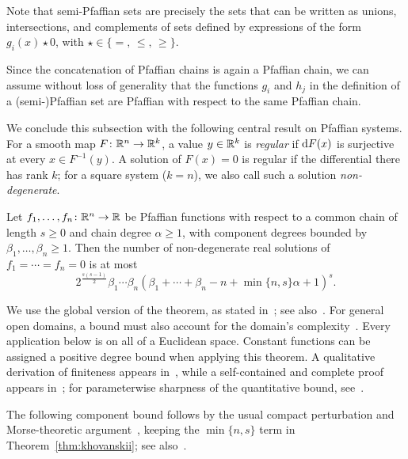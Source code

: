 Note that semi-Pfaffian sets are precisely the sets that can be written as unions, intersections, and complements of sets defined by expressions of the form $g_i(x) \star 0$, with $\star \in \{=,\, \leq,\, \geq\}$. 

\begin{remark}
  Since the concatenation of Pfaffian chains is again a Pfaffian chain, we can assume without loss of generality that the functions $g_i$ and $h_j$ in the definition of a (semi-)Pfaffian set are Pfaffian with respect to the same Pfaffian chain.
\end{remark} 

We conclude this subsection with the following central result on Pfaffian systems.
For a smooth map $F\colon \mathbb{R}^n\to\mathbb{R}^k$, a value $y\in\mathbb{R}^k$ is \emph{regular} if $\mathrm{d}{F}(x)$ is surjective at every $x\in F^{-1}(y)$. A solution of $F(x)=0$ is regular if the differential there has rank $k$; for a square system ($k=n$), we also call such a solution \emph{non-degenerate}.

\begin{theorem}[Khovanskii]\label{thm:khovanskii}
Let $f_1,\dots,f_n\colon\mathbb{R}^n\to\mathbb{R}$ be Pfaffian functions with respect to a common chain of length $s\ge0$ and chain degree $\alpha\ge1$, with component degrees bounded by $\beta_1,\dots,\beta_n\ge1$. Then the number of non-degenerate real solutions of $f_1=\cdots=f_n=0$ is at most
\begin{equation*}
2^{\frac{s(s-1)}2}\beta_1\cdots\beta_n
\left(\beta_1+\cdots+\beta_n-n+\min\{n,s\}\alpha+1\right)^s.
\end{equation*}
\end{theorem}

We use the global version of the theorem, as stated in~\cite[Theorem 3.1]{gabrielov2004complexity}; see also~\cite[\S 3.12, Corollary 5]{khovanskii1991fewnomials}. For general open domains, a bound must also account for the domain's complexity~\cite[Remark 2.12]{gabrielov2004complexity}. Every application below is on all of a Euclidean space. Constant functions can be assigned a positive degree bound when applying this theorem.
A qualitative derivation of finiteness appears in~\cite{Marker1997}, while a self-contained and complete proof appears in~\cite{lotz2026khovanskii}; for parameterwise sharpness of the quantitative bound, see~\cite{bickerton2026sharpnesskhovanskiisbezouttypebound}.

The following component bound follows by the usual compact perturbation and Morse-theoretic argument~\cite[Corollary 3.3]{gabrielov2004complexity}, keeping the $\min\{n,s\}$ term in Theorem~\ref{thm:khovanskii}; see also~\cite{lotz2026khovanskii}.

